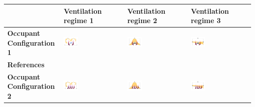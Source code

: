 \documentclass[a4paper,12pt]{elsarticle}
\begin{document}
\begin{table}[h!]
\captionsetup{font=normalsize}
    \footnotesize
    \centering
    \begin{tabular}{|m{2.5cm}|m{4cm}|m{4cm}|m{4cm}|}
    \hline
     & \textbf{Ventilation regime 1} & \textbf{Ventilation regime 2} & \textbf{Ventilation regime 3} \\
    \hline
    \textbf{Occupant Configuration 1} & \includegraphics[clip,trim={0 2cm 0 2cm},width=0.25\textwidth]{Airflow/mat1.jpeg}& \includegraphics[clip,trim={0 2cm 0 2cm},width=0.25\textwidth]{Airflow/mat4.jpeg}& \includegraphics[clip,trim={0 2cm 0 2cm},width=0.25\textwidth]{Airflow/mat7.jpeg} \\
    \hline
    \textbf{References} & \cite{li2020investigating,zhou2021experimental,pan2022boundary,pan2023predicting,li2022airborne} & \cite{deng2021control,zhou2021experimental,wu2023numerical} & \cite{pendar2020numerical,feng2020influence} \\
    \hline
    \textbf{Occupant Configuration 2} &\includegraphics[clip,trim={0 2cm 0 2cm},width=0.25\textwidth]{Airflow/mat2.jpeg}& \includegraphics[clip,trim={0 2cm 0 2cm},width=0.25\textwidth]{Airflow/mat5.jpeg}& \includegraphics[clip,trim={0 2cm 0 2cm},width=0.25\textwidth]{Airflow/mat8.jpeg} \\

\end{tabular}
\end{table}
\end{document}
